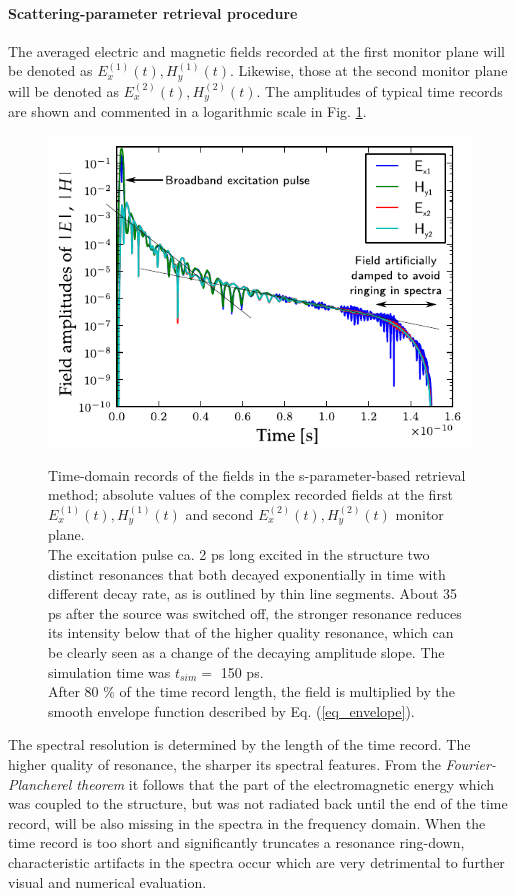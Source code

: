 \paragraph{Scattering-parameter retrieval procedure} %
The averaged electric and magnetic fields recorded at the first monitor plane will be denoted as $E_{x}^{(1)}(t), H_{y}^{(1)}(t)$. Likewise, those at the second monitor plane will be denoted as $E_{x}^{(2)}(t), H_{y}^{(2)}(t)$. The amplitudes of typical time records are shown and commented in a logarithmic scale in Fig. \ref{fg_sparam_timedomain}.  
\begin{figure}[ht] \centering \caption{Time-domain records of the fields in the s-parameter-based retrieval method; absolute values of the complex recorded fields at the first $E_{x}^{(1)}(t), H_{y}^{(1)}(t)$ and second $E_{x}^{(2)}(t), H_{y}^{(2)}(t)$ monitor plane.\\
The excitation pulse ca. 2 ps long excited in the structure two distinct resonances that both decayed exponentially in time with different decay rate, as is outlined by thin line segments. About 35 ps after the source was switched off, the stronger resonance reduces its intensity below that of the higher quality resonance, which can be clearly seen as a change of the decaying amplitude slope. The simulation time  was $t_{sim} =$ 150 ps. \\
After 80 \% of the time record length, the field is multiplied by the smooth envelope function described by Eq. (\ref{eq_envelope}).} \includegraphics[width=.7\textwidth]{img/sim_timedomain_debug.pdf} \label{fg_sparam_timedomain} \end{figure}

The spectral resolution is determined by the length of the time record. The higher quality of resonance, the sharper its spectral features. %
From the \textit{Fourier-Plancherel theorem} %
it follows that the part of the electromagnetic energy which was coupled to the structure, but was not radiated back until the end of the time record, will be also missing in the spectra in the frequency domain. When the time record is too short and significantly truncates a resonance ring-down, characteristic artifacts in the spectra occur which are very detrimental to further visual and numerical evaluation. 

